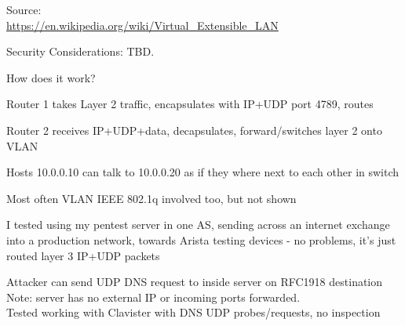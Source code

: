 \documentclass[Screen16to9,17pt]{foils}
\begin{document}
Source:\\
\url{https://en.wikipedia.org/wiki/Virtual_Extensible_LAN}

\vskip 1cm
Security Considerations:   TBD.




How does it work?

\begin{list2}
\item Router 1 takes Layer 2 traffic, encapsulates with IP+UDP port 4789, routes
\item Router 2 receives IP+UDP+data, decapsulates, forward/switches layer 2 onto VLAN
\item Hosts 10.0.0.10 can talk to 10.0.0.20 as if they where next to each other in switch
\item Most often VLAN IEEE 802.1q involved too, but not shown
\end{list2}



I tested using my pentest server in one AS, sending across an internet exchange into a production network, towards Arista testing devices - no problems, it's just routed layer 3 IP+UDP packets



Attacker can send UDP DNS request to inside server on RFC1918 destination\\
Note: server has no external IP or incoming ports forwarded.\\
Tested working with Clavister with DNS UDP probes/requests, no inspection
\end{document}
